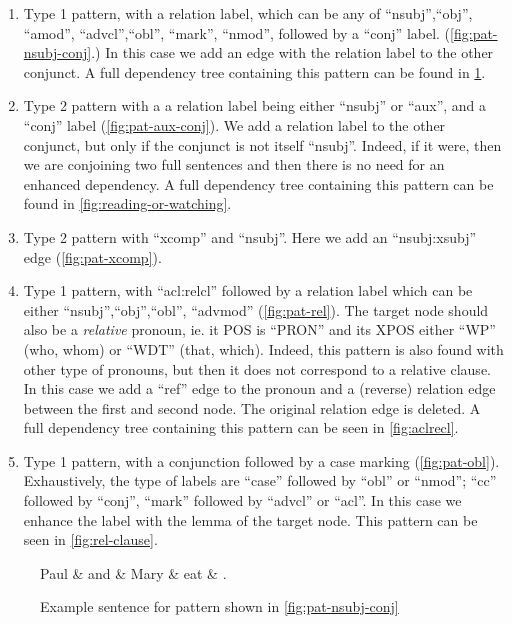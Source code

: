 \documentclass[11pt,a4paper]{article}
\begin{document}
\begin{enumerate}
\item Type 1 pattern, with a relation label, which can be any of
  ``nsubj'',``obj'', ``amod'', ``advcl'',``obl'', ``mark'', ``nmod'', followed by a
  ``conj'' label. (\cref{fig:pat-nsubj-conj}.) In this case we add an
  edge with the relation label to the other conjunct.
  A full dependency tree containing this pattern can be found in \cref{fig:paul-and-mary}.
  \label{item:paul-and-mary}
\item Type 2 pattern with a a relation label being either ``nsubj'' or
  ``aux'', and a ``conj'' label (\cref{fig:pat-aux-conj}). We add a
  relation label to the other conjunct, but only if the
  conjunct is not itself ``nsubj''. Indeed, if it were, then we are
  conjoining two full sentences and then there is no need for an
  enhanced dependency.
  A full dependency tree containing this pattern can be found in \cref{fig:reading-or-watching}.
  \label{item:reading-or-watching}
\item Type 2 pattern with ``xcomp'' and ``nsubj''. Here we add an
  ``nsubj:xsubj'' edge (\cref{fig:pat-xcomp}).
\item Type 1 pattern, with ``acl:relcl'' followed by a relation label
  which can be either ``nsubj'',``obj'',``obl'',
  ``advmod'' (\cref{fig:pat-rel}). The target node should also be a
  \emph{relative} pronoun, ie. it POS is ``PRON'' and its XPOS either
  ``WP'' (who, whom) or ``WDT'' (that, which). Indeed, this pattern is
  also found with other type of pronouns, but then it does not
  correspond to a relative clause.  In this case we add a ``ref'' edge to
  the pronoun and a (reverse) relation edge between the first and
  second node. The original relation edge is deleted. A full dependency
  tree containing this pattern can be seen in \cref{fig:aclrecl}.
  \item Type 1 pattern, with a conjunction followed by a case
   marking (\cref{fig:pat-obl}). Exhaustively, the type of labels
   are ``case'' followed by ``obl'' or ``nmod''; ``cc'' followed by
   ``conj'', ``mark'' followed by ``advcl'' or ``acl''. In this case we
   enhance the label with the lemma of the target node. This pattern
   can be seen in \cref{fig:rel-clause}.
\end{enumerate}

\begin{figure}[h]
    \centering
    \begin{dependency}
    \begin{deptext}[column sep=1em]
    Paul \& and \& Mary \& eat \& . \\
    \end{deptext}
    \end{dependency}
    \caption{Example sentence for pattern shown in \cref{fig:pat-nsubj-conj}}
    \label{fig:paul-and-mary}
\end{figure}
\end{document}
